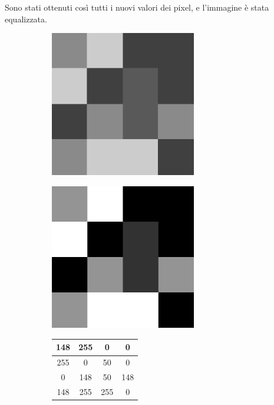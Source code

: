 \documentclass[11pt]{article}
\begin{document}
    \vspace{10mm} 
    Sono stati ottenuti così tutti i nuovi valori dei pixel, e l'immagine è stata equalizzata.
    \renewcommand{\arraystretch}{1.9}
    \begin{figure}[ht]
        \centering
        \begin{subfigure}{0.32\textwidth}
            \centering
            \includegraphics[width=0.7\textwidth]{example-small.png}
        \end{subfigure}
        \begin{subfigure}{0.32\textwidth}
            \centering
            \includegraphics[width=0.7\textwidth]{example-small-eq.png}
        \end{subfigure}
        \begin{subfigure}{0.32\textwidth}
            \centering
            \begin{tabular}{ |c|c|c|c| }
                \hline
                148 & 255 & 0 & 0 \\
                \hline
                255 & 0 & 50 & 0 \\
                \hline
                0 & 148 & 50 & 148 \\
                \hline
                148 & 255 & 255 & 0 \\
                \hline
            \end{tabular}
        \end{subfigure}
        

\end{figure}
\end{document}
